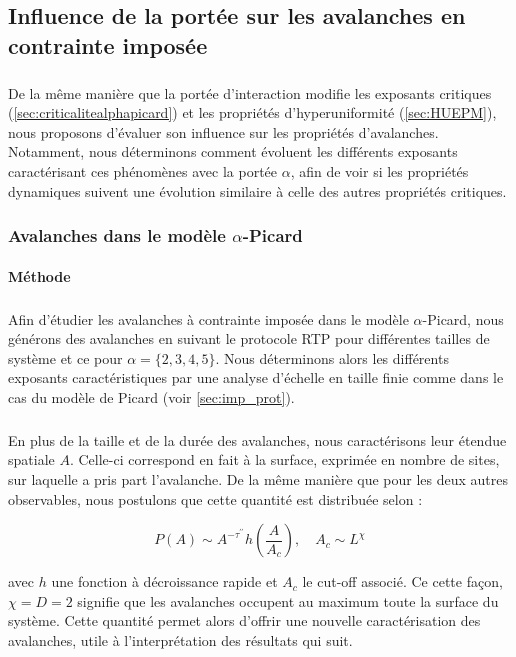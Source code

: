 \subsection{Influence de la portée sur les avalanches en contrainte imposée}

\subparagraph{}De la même manière que la portée d'interaction modifie les exposants critiques (\autoref{sec:criticalitealphapicard}) et les propriétés d'hyperuniformité (\autoref{sec:HUEPM}), nous proposons d'évaluer son influence sur les propriétés d'avalanches. Notamment, nous déterminons comment évoluent les différents exposants caractérisant ces phénomènes avec la portée $\alpha$, afin de voir si les propriétés dynamiques suivent une évolution similaire à celle des autres propriétés critiques.

\subsubsection{Avalanches dans le modèle $\alpha$-Picard}

\label{sec:Av_PicardMain}

\paragraph{Méthode}

\subparagraph{}Afin d'étudier les avalanches à contrainte imposée dans le modèle $\alpha$-Picard, nous générons des avalanches en suivant le protocole RTP pour différentes tailles de système et ce pour $\alpha = \{2, 3, 4, 5\}$. Nous déterminons alors les différents exposants caractéristiques par une analyse d'échelle en taille finie comme dans le cas du modèle de Picard (voir \autoref{sec:imp_prot}). 

\subparagraph{}En plus de la taille et de la durée des avalanches, nous caractérisons leur étendue spatiale $A$. Celle-ci correspond en fait à la surface, exprimée en nombre de sites, sur laquelle a pris part l'avalanche. De la même manière que pour les deux autres observables, nous postulons que cette quantité est distribuée selon :

\begin{equation}
	P(A) \sim A^{-\tau^{\prime\prime}}h\left( \frac{A}{A_c} \right),\quad A_c \sim L^\chi
	\label{eq:distA}
\end{equation}

\noindent avec $h$ une fonction à décroissance rapide et $A_c$ le cut-off associé. Ce cette façon, $\chi=D=2$ signifie que les avalanches occupent au maximum toute la surface du système. Cette quantité permet alors d'offrir une nouvelle caractérisation des avalanches, utile à l'interprétation des résultats qui suit.

